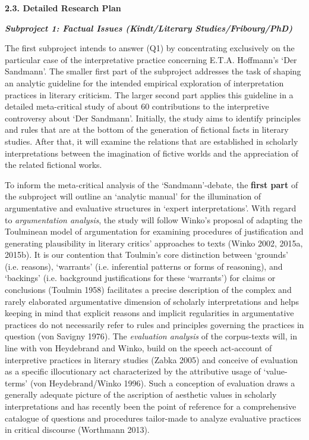 \noindent\textbf{\large 2.3. Detailed Research Plan}




\vspace{.2cm}
\noindent\textbf{\emph{Subproject 1: Factual Issues (Kindt/Literary Studies/Fribourg/PhD)}}
\vspace{.1cm}

\noindent The first subproject intends to answer (Q1) by concentrating exclusively on the particular case of the interpretative practice concerning E.T.A. Hoffmann's `Der Sandmann'. The smaller first part of the subproject addresses the task of shaping an analytic guideline for the intended empirical exploration of interpretation practices in literary criticism. The larger second part applies this guideline in a detailed meta-critical study of about 60 contributions to the interpretive controversy about `Der Sandmann'. Initially, the study aims to identify principles and rules that are at the bottom of the generation of fictional facts in literary studies. After that, it will examine the relations that are established in scholarly interpretations between the imagination of fictive worlds and the appreciation of the related fictional works.


To inform  the meta-critical analysis of the `Sandmann'-debate, the \textbf{first part} of the subproject will outline an `analytic manual' for the illumination of argumentative and evaluative structures in `expert interpretations'. With regard to \emph{argumentation analysis}, the study will follow Winko's proposal of adapting the Toulminean model of argumentation for examining procedures of justification and generating plausibility in literary critics' approaches to texts (Winko 2002, 2015a, 2015b). It is our contention that Toulmin's core distinction between `grounds' (i.e. reasons), `warrants' (i.e. inferential patterns or forms of reasoning), and `backings' (i.e. background justifications for these `warrants') for claims or conclusions (Toulmin 1958) facilitates a precise description of the complex and rarely elaborated argumentative dimension of scholarly interpretations and helps keeping in mind that explicit reasons and implicit regularities in argumentative practices do not necessarily refer to rules and principles governing the practices in question (von Savigny 1976). The \emph{evaluation analysis} of the corpus-texts will, in line with von Heydebrand and Winko, build on the speech act-account of interpretive practices in literary studies (Zabka 2005) and conceive of evaluation as a specific illocutionary act characterized by the attributive usage of `value-terms' (von Heydebrand/Winko 1996). Such a conception of evaluation draws a generally adequate picture of the ascription of aesthetic values in scholarly interpretations and has recently been the point of reference for a comprehensive catalogue of questions and procedures tailor-made to analyze evaluative practices in critical discourse (Worthmann 2013).

